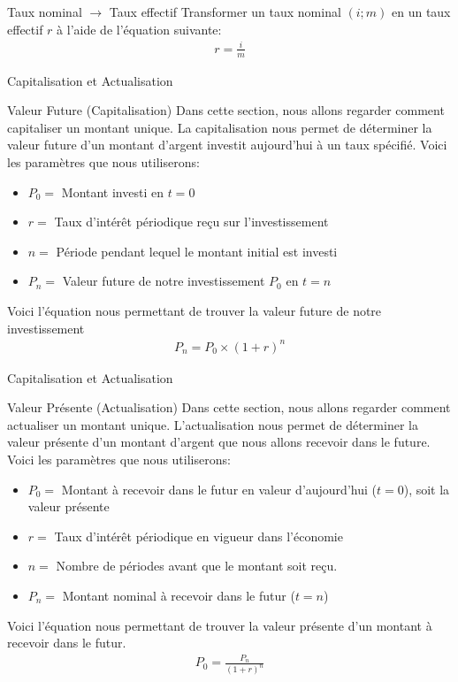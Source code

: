 \documentclass[11pt]{beamer}
\begin{document}
\begin{frame}{Taux nominal $\rightarrow$ Taux effectif}
Transformer un taux nominal $(i;m)$ en un taux effectif $r$ à l'aide de l'équation suivante:
\begin{align*}
r=\frac{i}{m}
\end{align*}
\end{frame}

\begin{frame}{Capitalisation et Actualisation}
\begin{block}{Valeur Future (Capitalisation)}
Dans cette section, nous allons regarder comment capitaliser un montant unique. La capitalisation nous permet de déterminer la valeur future d'un montant d'argent investit aujourd'hui à un taux spécifié. Voici les paramètres que nous utiliserons:
\begin{itemize}
\item $P_0=$ Montant investi en $t=0$ 
\item $r=$ Taux d'intérêt périodique reçu sur l'investissement
\item $n=$ Période pendant lequel le montant initial est investi
\item $P_n=$ Valeur future de notre investissement $P_0$ en $t=n$
\end{itemize}
Voici l'équation nous permettant de trouver la valeur future de notre investissement 
\begin{align*}
P_n=P_0 \times (1+r)^n
\end{align*}
\end{block}
\end{frame}

\begin{frame}{Capitalisation et Actualisation}
\begin{block}{Valeur Présente (Actualisation)}
Dans cette section, nous allons regarder comment actualiser un montant unique. L'actualisation nous permet de déterminer la valeur présente d'un montant d'argent que nous allons recevoir dans le future. Voici les paramètres que nous utiliserons:
\begin{itemize}
\item $P_0=$ Montant à recevoir dans le futur en valeur d'aujourd'hui ($t=0$), soit la valeur présente  
\item $r=$ Taux d'intérêt périodique en vigueur dans l'économie
\item $n=$ Nombre de périodes avant que le montant soit reçu.
\item $P_n=$ Montant nominal à recevoir dans le futur ($t=n$)
\end{itemize}
Voici l'équation nous permettant de trouver la valeur présente d'un montant à recevoir dans le futur.
\begin{align*}
P_0=\frac{P_n}{(1+r)^n}
\end{align*}
\end{block}
\end{frame}
\end{document}

